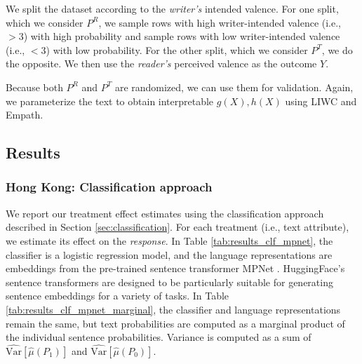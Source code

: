 \documentclass{article}
\begin{document}
We split the dataset according to the \textit{writer's} intended valence. For one split, which we consider $P^R$, we sample rows with high writer-intended valence (i.e., $>3$) with high probability and sample rows with low writer-intended valence (i.e., $<3$) with low probability. For the other split, which we consider $P^T$, we do the opposite. We then use the \textit{reader's} perceived valence as the outcome $Y$.

Because both $P^R$ and $P^T$ are randomized, we can use them for validation. Again, we parameterize the text to obtain interpretable $g(X), h(X)$ using LIWC and Empath.

\subsection{Results}

\subsubsection{Hong Kong: Classification approach}

We report our treatment effect estimates using the classification approach described in Section \ref{sec:classification}. For each treatment (i.e., text attribute), we estimate its effect on the \textit{response}. In Table \ref{tab:results_clf_mpnet}, the classifier is a logistic regression model, and the language representations are embeddings from the pre-trained sentence transformer MPNet \cite{song2020mpnet}. HuggingFace's sentence transformers are designed to be particularly suitable for generating sentence embeddings for a variety of tasks. In Table \ref{tab:results_clf_mpnet_marginal}, the classifier and language representations remain the same, but text probabilities are computed as a marginal product of the individual sentence probabilities. Variance is computed as a sum of $\widehat{\text{Var}}[\hat{\mu}(P_1)]$ and $\widehat{\text{Var}}[\hat{\mu}(P_0)]$.
\end{document}
